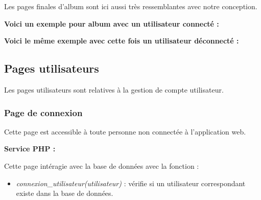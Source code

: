         \clearpage
        
			\begin{paragraphe}
                Les pages finales d'album sont ici aussi très ressemblantes avec notre conception.
			\end{paragraphe}

			\begin{paragraphe}
                \textbf{Voici un exemple pour album avec un utilisateur connecté :}
			\end{paragraphe}
            

			\begin{paragraphe}
                \textbf{Voici le même exemple avec cette fois un utilisateur déconnecté :}
			\end{paragraphe}
            

	\clearpage

	\subsection{Pages utilisateurs}
      \begin{paragraphe}
            Les pages utilisateurs sont relatives à la gestion de compte utilisateur.
        \end{paragraphe}

		\subsubsection{Page de connexion}

			\begin{paragraphe}
				Cette page est accessible à toute personne non connectée à l'application web.
			\end{paragraphe}

			\begin{paragraphe}
				\textbf{Service PHP :}
			\end{paragraphe}

			\begin{paragraphe}
			    Cette page intéragie avec la base de données avec la fonction :
				\begin{itemize}
					\item \emph{connexion\_utilisateur(utilisateur)} : vérifie si un utilisateur correspondant existe dans la base de données.
				\end{itemize}
			\end{paragraphe}

